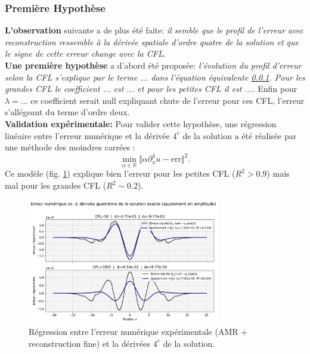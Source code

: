 \subsubsection{Première Hypothèse}
\textbf{L'observation} suivante a de plus été faite: \textit{il semble que le profil de l'erreur avec reconstruction ressemble à la dérivée spatiale d'ordre quatre
de la solution et que le signe de cette erreur change avec la CFL}.\\
\textbf{Une première hypothèse} a d'abord été proposée: \textit{l'évolution du profil d'erreur selon la CFL s'explique par le terme ... dans l'équation équivalente \ref{}.
Pour les grandes CFL le coefficient ... est ... et pour les petites CFL il est ....} Enfin pour $\lambda = \dots$ ce coefficient serait null expliquant 
chute de l'erreur pour ces CFL, l'erreur s'allégeant du terme d'ordre deux.\\
\textbf{Validation expérimentale:} Pour valider cette hypothèse, une régression linéaire entre l'erreur numérique et la dérivée $4^e$ de la solution a été réalisée par 
une méthode des moindres carrées : $$\min_{\alpha \in \mathbb R} \Vert \alpha \partial_x^4 u - \text{err} \Vert^2.$$
Ce modèle (fig. \ref{fig:derive4_vs_err}) explique bien l'erreur pour les petites CFL ($R^2>0.9$) mais mal pour les grandes CFL ($R^2 \sim 0.2$).
\begin{figure}[htpb]
    \centering
    \includegraphics[width=0.75\textwidth]{media/4_travail/3/erreur_vs_deriv4.pdf}
    \caption{Régression entre l'erreur numérique expérimentale (AMR + reconstruction fine) et la dérivées $4^e$ de la solution.}
    \label{fig:derive4_vs_err}
\end{figure}
